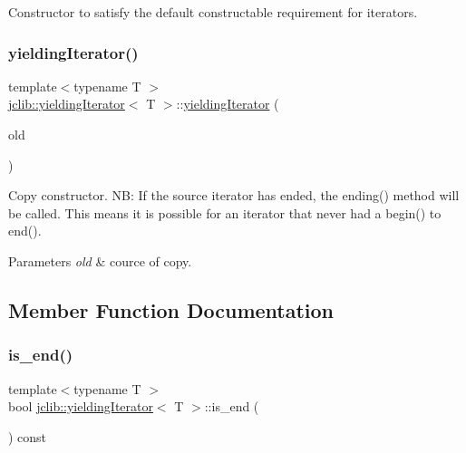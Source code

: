 Constructor to satisfy the default constructable requirement for iterators. \mbox{\label{classjclib_1_1yieldingIterator_a8aaf76517fb120bca9cae336eff64458}} 
\subsubsection{\texorpdfstring{yielding\+Iterator()}{yieldingIterator()}\hspace{0.1cm}{\footnotesize\ttfamily [3/3]}}
{\footnotesize\ttfamily template$<$typename T $>$ \\
\hyperlink{classjclib_1_1yieldingIterator}{jclib\+::yielding\+Iterator}$<$ T $>$\+::\hyperlink{classjclib_1_1yieldingIterator}{yielding\+Iterator} (\begin{DoxyParamCaption}\item[{const \hyperlink{classjclib_1_1yieldingIterator}{yielding\+Iterator}$<$ T $>$ \&}]{old }\end{DoxyParamCaption})\hspace{0.3cm}{\ttfamily [inline]}}

Copy constructor. NB\+: If the source iterator has ended, the ending() method will be called. This means it is possible for an iterator that never had a begin() to end(). 
\begin{DoxyParams}{Parameters}
{\em old} & cource of copy. \\
\hline
\end{DoxyParams}


\subsection{Member Function Documentation}
\mbox{\label{classjclib_1_1yieldingIterator_a2a80f65927659a1e913a9ed318113756}} 
\subsubsection{\texorpdfstring{is\+\_\+end()}{is\_end()}}
{\footnotesize\ttfamily template$<$typename T $>$ \\
bool \hyperlink{classjclib_1_1yieldingIterator}{jclib\+::yielding\+Iterator}$<$ T $>$\+::is\+\_\+end (\begin{DoxyParamCaption}{ }\end{DoxyParamCaption}) const\hspace{0.3cm}{\ttfamily [inline]}}

